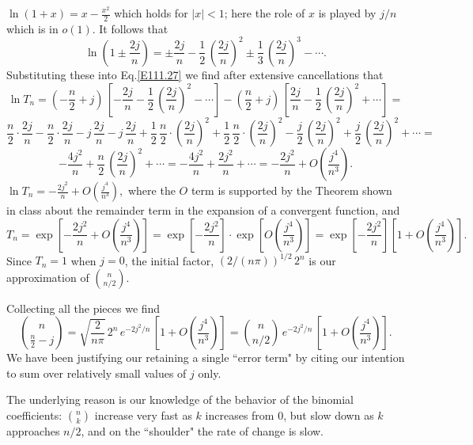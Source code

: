 \documentclass[11pt]{article}
\newcommand{\bc}{binomial coefficient\xspace}
\newcommand{\lp}{\left(}
\newcommand{\rp}{\right)}
\begin{document}
$ \ln (1+x) = x - \frac{x^2}{2}$ which holds for $\vert x\vert <1$;
here the role of $x$ is played by $j/n$ which is in $o(1)$.
It follows that 
\[
\ln\lp1\pm\frac{2j}{n} \rp = \pm\frac{2j}{n} -\frac{1}{2} \,\lp 
\frac{2j}{n}  \rp^2 \pm \frac{1}{3} \,\lp\frac{2j}{n}  \rp^3 - \cdots.
\]
Substituting these into Eq.\;\eqref{E111.27} we find after extensive
cancellations that
\[
\ln T_n = \lp -\frac{n}{2} +j \rp \,\left[ - \frac{2j}{n} -\frac{1}{2}
\,\lp \frac{2j}{n}  \rp^2 - \cdots \right] - \lp \frac{n}{2} +j
\rp \,\left[ \frac{2j}{n} -\frac{1}{2} \,\lp \frac{2j}{n}  \rp^2 +
\cdots \right] = 
\]
\[
\frac{n}{2} \cdot \frac{2j}{n} - \frac{n}{2} \cdot \frac{2j}{n}
-j\,\frac{2j}{n} - j\,\frac{2j}{n} + \frac{1}{2}\,\frac{n}{2} \cdot \lp 
\frac{2j}{n} \rp^2 + \frac{1}{2}\,\frac{n}{2} \cdot \lp 
\frac{2j}{n} \rp^2 - \frac{j}{2} \,\lp \frac{2j}{n} \rp^2 +
\frac{j}{2} \,\lp \frac{2j}{n} \rp^2 + \cdots =
\]
\[
-\frac{4 j^2}{n} + \frac{n}{2} \,\lp \frac{2j}{n} \rp^2 + \cdots =
-\frac{4 j^2}{n} + \frac{2 j^2}{n} + \cdots = -\frac{2 j^2}{n} + O\lp 
 \frac{j^4}{n^3} \rp .
\]
$ \ln T_n = - \frac{2 j^2}{n} + O\lp \frac{j^4}{n^3} \rp,$
where the $O$ term is supported by the Theorem shown in class about the
remainder term in the expansion of a convergent function, and
\[
T_n = \exp \left[ - \frac{2 j^2}{n} + O\lp \frac{j^4}{n^3} \rp \right]
= \exp \left[ - \frac{2 j^2}{n} \right] \cdot
\exp\left[O\lp \frac{j^4}{n^3}\rp\right]
= \exp \left[ - \frac{2 j^2}{n} \right]
\left[1 + O\lp \frac{j^4}{n^3}\rp\right] .
\]
Since $T_n=1$ when $j=0$, the initial factor, $(2/(n\pi ))^{1/2} \,2^n$
is our approximation of $\binom{n}{n/2}$. 

Collecting all the pieces we find
\begin{equation}\label{E112.8}
\binom{n}{\frac{n}{2} -j} =
\sqrt{\frac{2}{n\pi}} \,2^n \, e^{-2 j^2 /n} \, \left[1+O\lp\frac{j^4}{n^3}
\rp \right]
= \binom{n}{n/2}\, e^{-2 j^2 /n} \,
\left[ 1 + O\lp \frac{j^4}{n^3} \rp \right] . 
\end{equation}
We have been justifying our retaining a single ``error term" by citing our
intention to sum over relatively small values of $j$ only.

The underlying
reason is our knowledge of the behavior of the \bc{s}: $\binom{n}{k}$
increase very fast as $k$ increases from 0, but slow down as $k$
approaches $n/2$, and on the ``shoulder" the rate of change is
slow.\\[1.3ex]
\end{document}
